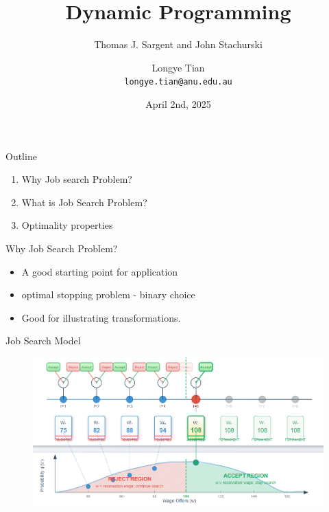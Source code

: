 \documentclass[aspectratio=169]{beamer} %
\title[DP2]{Dynamic Programming}
\subtitle{Thomas J. Sargent and John Stachurski}
\author[Longye]{Longye Tian \\ \texttt{longye.tian@anu.edu.au}}
\institute[ANU]{Australian National University\\ School of Economics}
\date{April 2nd, 2025}
\begin{document}
\begin{frame}
  \titlepage
\end{frame}

\begin{frame}{Outline}
  \begin{enumerate}
      \item Why Job search Problem?
      \item What is Job Search Problem?
      \item Optimality properties
  \end{enumerate}
\end{frame}

\begin{frame}{Why Job Search Problem?}
    \begin{itemize}
        \item A good starting point for application 
        \item optimal stopping problem - binary choice
        \item Good for illustrating transformations.
    \end{itemize}
\end{frame}


\begin{frame}{Job Search Model}
    \begin{figure}
        \centering
        \includegraphics[width=0.95\linewidth]{Dynamic Programming/DP2/Chapter 4/Section 4.1.1. Job Search/Job Search Model.png}
    \end{figure}
\end{frame}
\end{document}

